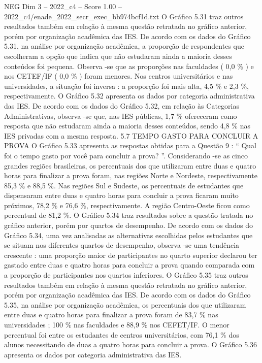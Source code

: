 \begin{textsample}{NEG Dim 3 – 2022\_c4 – Score 1.00 – 2022\_c4/enade\_2022\_secr\_exec\_bb974bcf1d.txt}
O Gráfico 5.31 traz outros resultados também em relação à mesma questão retratada no gráfico anterior, porém por organização acadêmica das IES.
De acordo com os dados do Gráfico 5.31, na análise por organização acadêmica, a proporção de respondentes que escolheram a opção que indica que não estudaram ainda a maioria desses conteúdos foi pequena.
Observa -se que as proporções nas faculdades ( 0,0 \% ) e nos CETEF/IF ( 0,0 \% ) foram menores.
Nos centros universitários e nas universidades, a situação foi inversa : a proporção foi mais alta, 4,5 \% e 2,3 \%, respectivamente.
O Gráfico 5.32 apresenta os dados por categoria administrativa das IES.
De acordo com os dados do Gráfico 5.32, em relação às Categorias Administrativas, observa -se que, nas IES públicas, 1,7 \% ofereceram como resposta que não estudaram ainda a maioria desses conteúdos, sendo 4,8 \% nas IES privadas com a mesma resposta. 5.7 TEMPO GASTO PARA CONCLUIR A PROVA O Gráfico 5.33 apresenta as respostas obtidas para a Questão 9 : “ Qual foi o tempo gasto por você para concluir a prova? ”.
Considerando -se as cinco grandes regiões brasileiras, os percentuais dos que utilizaram entre duas e quatro horas para finalizar a prova foram, nas regiões Norte e Nordeste, respectivamente 85,3 \% e 88,5 \%.
Nas regiões Sul e Sudeste, os percentuais de estudantes que dispensaram entre duas e quatro horas para concluir a prova ficaram muito próximos, 78,2 \% e 76,6 \%, respectivamente.
A região Centro-Oeste ficou como percentual de 81,2 \%.
O Gráfico 5.34 traz resultados sobre a questão tratada no gráfico anterior, porém por quartos de desempenho.
De acordo com os dados do Gráfico 5.34, uma vez analisadas as alternativas escolhidas pelos estudantes que se situam nos diferentes quartos de desempenho, observa -se uma tendência crescente : uma proporção maior de participantes no quarto superior declarou ter gastado entre duas e quatro horas para concluir a prova quando comparada com a proporção de participantes nos quartos inferiores.
O Gráfico 5.35 traz outros resultados também em relação à mesma questão retratada no gráfico anterior, porém por organização acadêmica das IES.
De acordo com os dados do Gráfico 5.35, na análise por organização acadêmica, os percentuais dos que utilizaram entre duas e quatro horas para finalizar a prova foram de 83,7 \% nas universidades ; 100 \% nas faculdades e 88,9 \% nos CEFET/IF.
O menor percentual foi entre os estudantes de centros universitários, com 76,1 \% dos alunos necessitando de duas a quatro horas para concluir a prova.
O Gráfico 5.36 apresenta os dados por categoria administrativa das IES.

\end{textsample}
